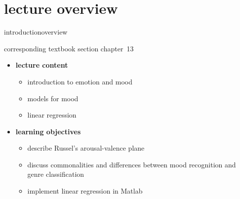 


\subtitle{module 13: mood recognition}


	

    \section[overview]{lecture overview}
        \begin{frame}{introduction}{overview}
            \begin{block}{corresponding textbook section}
                    chapter~13
            \end{block}

            \begin{itemize}
                \item   \textbf{lecture content}
                    \begin{itemize}
                        \item   introduction to emotion and mood
                        \item   models for mood
                        \item   linear regression
                    \end{itemize}
                \bigskip
                \item<2->   \textbf{learning objectives}
                    \begin{itemize}
                        \item   describe Russel's arousal-valence plane
                        \item   discuss commonalities and differences between mood recognition and genre classification
                        \item   implement linear regression in Matlab
                    \end{itemize}
            \end{itemize}
        \end{frame}

